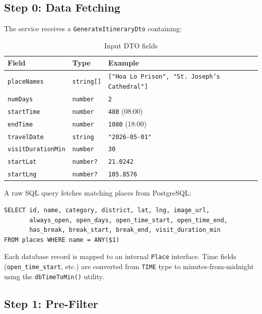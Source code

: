 \documentclass[12pt,a4paper]{report}
\begin{document}
\subsection{Step 0: Data Fetching}

The service receives a \texttt{GenerateItineraryDto} containing:

\begin{table}[H]
\centering
\begin{tabular}{|l|l|l|}
\hline
\textbf{Field} & \textbf{Type} & \textbf{Example} \\
\hline
\texttt{placeNames} & \texttt{string[]} & \texttt{["Hoa Lo Prison", "St. Joseph's Cathedral"]} \\
\texttt{numDays} & \texttt{number} & \texttt{2} \\
\texttt{startTime} & \texttt{number} & \texttt{480} (08:00) \\
\texttt{endTime} & \texttt{number} & \texttt{1080} (18:00) \\
\texttt{travelDate} & \texttt{string} & \texttt{"2026-05-01"} \\
\texttt{visitDurationMin} & \texttt{number} & \texttt{30} \\
\texttt{startLat} & \texttt{number?} & \texttt{21.0242} \\
\texttt{startLng} & \texttt{number?} & \texttt{105.8576} \\
\hline
\end{tabular}
\caption{Input DTO fields}
\end{table}

A raw SQL query fetches matching places from PostgreSQL:
\begin{verbatim}
SELECT id, name, category, district, lat, lng, image_url,
       always_open, open_days, open_time_start, open_time_end,
       has_break, break_start, break_end, visit_duration_min
FROM places WHERE name = ANY($1)
\end{verbatim}

Each database record is mapped to an internal \texttt{Place} interface. Time fields (\texttt{open\_time\_start}, etc.) are converted from \texttt{TIME} type to minutes-from-midnight using the \texttt{dbTimeToMin()} utility.

\subsection{Step 1: Pre-Filter}
\end{document}
